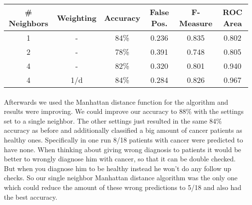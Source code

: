 \documentclass{article}
\begin{document}
\begin{center}
\begin{tabular}{ c | c | c | c | c | c }
\textbf{\# Neighbors} & \textbf{Weighting} & \textbf{Accuracy} & \textbf{False Pos.} & \textbf{F-Measure} & \textbf{ROC Area}\\
\hline
1 & - & 84\% & 0.236 & 0.835 &  0.802\\
2 & - & 78\% & 0.391 & 0.748 & 0.805\\
4 & - & 82\% & 0.320 & 0.801 & 0.940\\
4 & 1/d &  84\% & 0.284 & 0.826 & 0.967\\
\end{tabular}
\end{center}

\paragraph{}Afterwards we used the Manhattan distance function for the algorithm and results were improving. We could improve our accuracy to 88\% with the settings set to a single neighbor. The other settings just resulted in the same 84\% accuracy as before and additionally classified a big amount of cancer patients as healthy ones. Specifically in one run 8/18 patients with cancer were predicted to have none. When thinking about giving wrong diagnosis to patients it would be better to wrongly diagnose him with cancer, so that it can be double checked. But when you diagnose him to be healthy instead he won't do any follow up checks. So our single neighbor Manhattan distance algorithm was the only one which could reduce the amount of these wrong predictions to 5/18 and also had the best accuracy.
\end{document}
